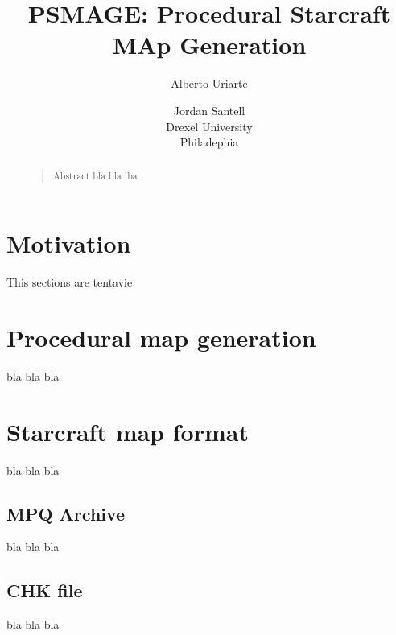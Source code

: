 \documentclass[letterpaper]{article}
\begin{document}
%
\title{PSMAGE: Procedural Starcraft MAp Generation}
\author{Alberto Uriarte \and Jordan Santell\\
Drexel University\\
Philadephia\\
}
\maketitle
\begin{abstract}
\begin{quote}
Abstract bla bla lba
\end{quote}
\end{abstract}

\section{Motivation}
This sections are tentavie

\section{Procedural map generation}
bla bla bla

\section{Starcraft map format}
bla bla bla

\subsection{MPQ Archive}
bla bla bla

\subsection{CHK file}
bla bla bla


% 
% 
\end{document}
